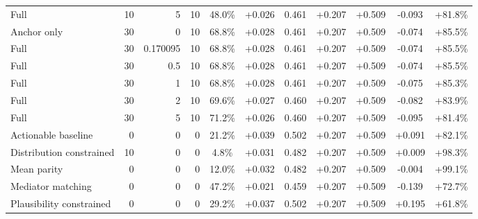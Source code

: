 \begin{table}[htbp]
\begin{tabular}{lrrrccccccc}
Full & 10 & 5 & 10 & 48.0\% & +0.026 & 0.461 & +0.207 & +0.509 & -0.093 & +81.8\% \\
Anchor only & 30 & 0 & 10 & 68.8\% & +0.028 & 0.461 & +0.207 & +0.509 & -0.074 & +85.5\% \\
Full & 30 & 0.170095 & 10 & 68.8\% & +0.028 & 0.461 & +0.207 & +0.509 & -0.074 & +85.5\% \\
Full & 30 & 0.5 & 10 & 68.8\% & +0.028 & 0.461 & +0.207 & +0.509 & -0.074 & +85.5\% \\
Full & 30 & 1 & 10 & 68.8\% & +0.028 & 0.461 & +0.207 & +0.509 & -0.075 & +85.3\% \\
Full & 30 & 2 & 10 & 69.6\% & +0.027 & 0.460 & +0.207 & +0.509 & -0.082 & +83.9\% \\
Full & 30 & 5 & 10 & 71.2\% & +0.026 & 0.460 & +0.207 & +0.509 & -0.095 & +81.4\% \\
Actionable baseline & 0 & 0 & 0 & 21.2\% & +0.039 & 0.502 & +0.207 & +0.509 & +0.091 & +82.1\% \\
Distribution constrained & 10 & 0 & 0 & 4.8\% & +0.031 & 0.482 & +0.207 & +0.509 & +0.009 & +98.3\% \\
Mean parity & 0 & 0 & 0 & 12.0\% & +0.032 & 0.482 & +0.207 & +0.509 & -0.004 & +99.1\% \\
Mediator matching & 0 & 0 & 0 & 47.2\% & +0.021 & 0.459 & +0.207 & +0.509 & -0.139 & +72.7\% \\
Plausibility constrained & 0 & 0 & 0 & 29.2\% & +0.037 & 0.502 & +0.207 & +0.509 & +0.195 & +61.8\% \\
\bottomrule
\end{tabular}
\end{table}